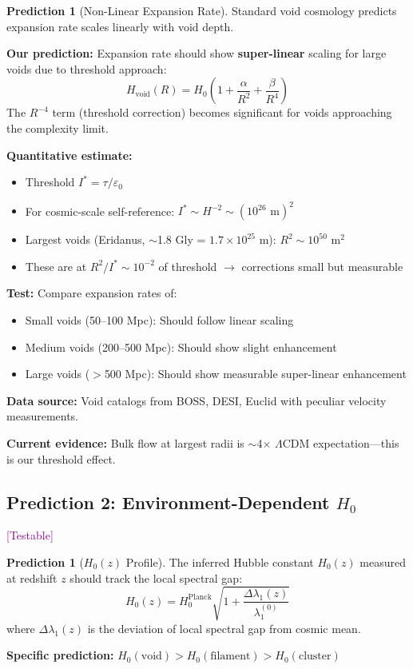 \documentclass[11pt,a4paper]{article}
\theoremstyle{plain}
\theoremstyle{definition}
\newtheorem{prediction}[theorem]{Prediction}
\theoremstyle{remark}
\newcommand{\testable}{\textcolor{purple}{[Testable]}}
\begin{document}
\begin{prediction}[Non-Linear Expansion Rate]
Standard void cosmology predicts expansion rate scales linearly with void depth.

\textbf{Our prediction:} Expansion rate should show \textbf{super-linear} scaling for large voids due to threshold approach:
\[
H_{\text{void}}(R) = H_0 \left(1 + \frac{\alpha}{R^2} + \frac{\beta}{R^4}\right)
\]
The $R^{-4}$ term (threshold correction) becomes significant for voids approaching the complexity limit.
\end{prediction}

\textbf{Quantitative estimate:}
\begin{itemize}[noitemsep]
    \item Threshold $I^* = \tau/\varepsilon_0$
    \item For cosmic-scale self-reference: $I^* \sim H^{-2} \sim (10^{26} \text{ m})^2$
    \item Largest voids (Eridanus, $\sim$1.8 Gly = $1.7 \times 10^{25}$ m): $R^2 \sim 10^{50}$ m$^2$
    \item These are at $R^2/I^* \sim 10^{-2}$ of threshold $\to$ corrections small but measurable
\end{itemize}

\textbf{Test:} Compare expansion rates of:
\begin{itemize}[noitemsep]
    \item Small voids (50--100 Mpc): Should follow linear scaling
    \item Medium voids (200--500 Mpc): Should show slight enhancement
    \item Large voids ($>$500 Mpc): Should show measurable super-linear enhancement
\end{itemize}

\textbf{Data source:} Void catalogs from BOSS, DESI, Euclid with peculiar velocity measurements.

\textbf{Current evidence:} Bulk flow at largest radii is $\sim$4$\times$ $\Lambda$CDM expectation---this is our threshold effect.

\subsection{Prediction 2: Environment-Dependent $H_0$} \testable

\begin{prediction}[$H_0(z)$ Profile]
The inferred Hubble constant $H_0(z)$ measured at redshift $z$ should track the local spectral gap:
\[
H_0(z) = H_0^{\text{Planck}} \sqrt{1 + \frac{\Delta\lambda_1(z)}{\lambda_1^{(0)}}}
\]
where $\Delta\lambda_1(z)$ is the deviation of local spectral gap from cosmic mean.

\textbf{Specific prediction:} $H_0(\text{void}) > H_0(\text{filament}) > H_0(\text{cluster})$
\end{prediction}
\end{document}
